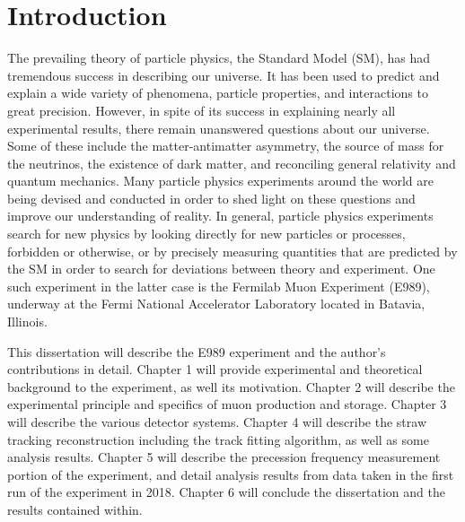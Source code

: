 
\thispagestyle{myheadings}
\graphicspath{{Body/Figures/Theory/}}

\chapter{Introduction}
\label{chapter:Introduction}

The prevailing theory of particle physics, the Standard Model (SM), has had tremendous success in describing our universe. It has been used to predict and explain a wide variety of phenomena, particle properties, and interactions to great precision. However, in spite of its success in explaining nearly all experimental results, there remain unanswered questions about our universe. Some of these include the matter-antimatter asymmetry, the source of mass for the neutrinos, the existence of dark matter, and reconciling general relativity and quantum mechanics. Many particle physics experiments around the world are being devised and conducted in order to shed light on these questions and improve our understanding of reality. In general, particle physics experiments search for new physics by looking directly for new particles or processes, forbidden or otherwise, or by precisely measuring quantities that are predicted by the SM in order to search for deviations between theory and experiment. One such experiment in the latter case is the Fermilab Muon \gmtwo Experiment (E989), underway at the Fermi National Accelerator Laboratory located in Batavia, Illinois.



This dissertation will describe the E989 experiment and the author's contributions in detail. Chapter 1 will provide experimental and theoretical background to the experiment, as well its motivation. Chapter 2 will describe the experimental principle and specifics of muon production and storage. Chapter 3 will describe the various detector systems. Chapter 4 will describe the straw tracking reconstruction including the track fitting algorithm, as well as some analysis results. Chapter 5 will describe the precession frequency measurement portion of the experiment, and detail analysis results from data taken in the first run of the experiment in 2018. Chapter 6 will conclude the dissertation and the results contained within.

